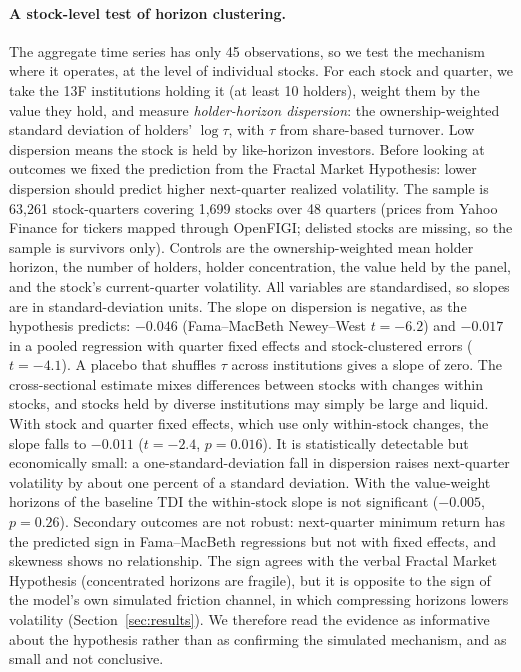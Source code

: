 \documentclass[preprint,12pt,authoryear]{elsarticle}
\begin{document}
\paragraph{A stock-level test of horizon clustering.}
The aggregate time series has only 45 observations, so we test the mechanism
where it operates, at the level of individual stocks.
For each stock and quarter, we take the 13F institutions holding it
(at least 10 holders), weight them by the value they hold, and measure
\emph{holder-horizon dispersion}: the ownership-weighted standard deviation of
holders' $\log\tau$, with $\tau$ from share-based turnover.
Low dispersion means the stock is held by like-horizon investors.
Before looking at outcomes we fixed the prediction from the Fractal Market
Hypothesis: lower dispersion should predict higher next-quarter realized
volatility.
The sample is 63{,}261 stock-quarters covering 1{,}699 stocks over 48 quarters
(prices from Yahoo Finance for tickers mapped through OpenFIGI; delisted
stocks are missing, so the sample is survivors only).
Controls are the ownership-weighted mean holder horizon, the number of
holders, holder concentration, the value held by the panel, and the stock's
current-quarter volatility.
All variables are standardised, so slopes are in standard-deviation units.
The slope on dispersion is negative, as the hypothesis predicts: $-0.046$ (Fama--MacBeth
Newey--West $t = -6.2$) and $-0.017$ in a pooled regression with quarter fixed
effects and stock-clustered errors ($t = -4.1$).
A placebo that shuffles $\tau$ across institutions gives a slope of zero.
The cross-sectional estimate mixes differences between stocks with changes
within stocks, and stocks held by diverse institutions may simply be large
and liquid.
With stock and quarter fixed effects, which use only within-stock changes, the
slope falls to $-0.011$ ($t = -2.4$, $p = 0.016$).
It is statistically detectable but economically small: a one-standard-deviation
fall in dispersion raises next-quarter volatility by about one percent of a
standard deviation.
With the value-weight horizons of the baseline TDI the within-stock slope is
not significant ($-0.005$, $p = 0.26$).
Secondary outcomes are not robust: next-quarter minimum return has the
predicted sign in Fama--MacBeth regressions but not with fixed effects, and
skewness shows no relationship.
The sign agrees with the verbal Fractal Market Hypothesis (concentrated
horizons are fragile), but it is opposite to the sign of the model's own
simulated friction channel, in which compressing horizons lowers volatility
(Section~\ref{sec:results}).
We therefore read the evidence as informative about the hypothesis rather than
as confirming the simulated mechanism, and as small and not conclusive.
\end{document}

